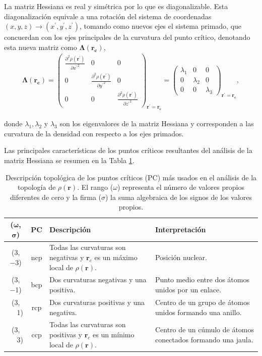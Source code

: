 La matriz Hessiana es real y simétrica por lo que es diagonalizable. Esta
diagonalización equivale a una rotación del sistema de coordenadas $(x, y, z)
\rightarrow (x^{\prime}, y^{\prime}, z^{\prime})$, tomando como nuevos ejes el
sistema primado, que concuerdan con los ejes principales de la curvatura del
punto crítico, denotando esta nueva matriz como
$\mathbf{\Lambda(\mathbf{r}_c)}$,
\begin{align}
\mathbf{\Lambda(\mathbf{r}_c)}=
  \begin{pmatrix}
  \frac{\partial^2\rho(\mathbf{r^{\prime}})}{\partial {x^{\prime}}^2} & 0 & 0\\
  0 & \frac{\partial^2\rho(\mathbf{r^{\prime}})}{\partial {y^{\prime}}^2} & 0\\
  0 & 0 & \frac{\partial^2\rho(\mathbf{r^{\prime}})}{\partial {z^{\prime}}^2}
\end{pmatrix}_{\mathbf{r^{\prime}=\mathbf{r}_{c}}} =
\begin{pmatrix}
  \lambda_1 & 0 & 0\\
  0 & \lambda_2 & 0\\
  0 & 0 & \lambda_3
\end{pmatrix}_{\mathbf{r^{\prime}=\mathbf{r}_{c}}} ,
\end{align}

\noindent donde $\lambda_1, \lambda_2$ y $\lambda_3$ son los eigenvalores de la
matriz Hessiana y corresponden a las curvatura de la densidad con respecto a
los ejes primados.

Las principales características de los puntos críticos resultantes del análisis
de la matriz Hessiana se resumen en la Tabla \ref{PuntosCriticos}.
\pagebreak
\begin{table}[ht]
\caption{Descripción topológica de los puntos críticos (PC) más usados en el
análisis de la topología de $\rho(\mathbf{r})$. El rango ($\omega$) representa
el número de valores propios diferentes de cero y la firma ($\sigma$) la suma
algebraica de los signos de los valores propios.}
\begin{tabular}{c c m{8cm} m{5cm}}
\textbf{($\mathbf{\omega}$, $\mathbf{\sigma}$)} & \textbf{PC} & \textbf{Descripción} & \textbf{Interpretación}\\ \hline \hline
(\num{3}, \num{-3}) & ncp & Todas las curvaturas son negativas y $\mathbf{r}_c$ es un máximo local de $\rho(\mathbf{r})$. & Posición nuclear.\\ \hline
(\num{3}, \num{-1}) & bcp & Dos curvaturas negativas y una positiva. & Punto medio entre dos átomos unidos por un enlace.\\ \hline
(\num{3}, $\phantom{-}$\num{+1}) & rcp & Dos curvaturas positivas y una negativa. & Centro de un grupo de átomos unidos formando una anillo.\\ \hline
(\num{3}, $\phantom{-}$\num{+3}) & ccp & Todas las curvaturas son positivas y $\mathbf{r}_c$ es un mínimo local de $\rho(\mathbf{r})$. & Centro de un cúmulo de átomos conectados formando una jaula.\\
\hline
\end{tabular}
\label{PuntosCriticos}
\end{table}

